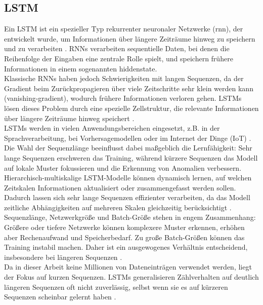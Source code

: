 \documentclass[a4paper,12pt]{article}
\begin{document}
	\subsection{LSTM}
	Ein LSTM ist ein spezieller Typ rekurrenter neuronaler Netzwerke (\gls{rnn}), der entwickelt wurde, um Informationen über längere Zeiträume hinweg zu speichern und zu verarbeiten \cite{hochreiter1997long}. RNNs verarbeiten sequentielle Daten, bei denen die Reihenfolge der Eingaben eine zentrale Rolle spielt, und speichern frühere Informationen in einem sogenannten \gls{hiddenstate}.  
	\\[0.5em]
	Klassische RNNs haben jedoch Schwierigkeiten mit langen Sequenzen, da der Gradient beim Zurückpropagieren über viele Zeitschritte sehr klein werden kann (\gls{vanishing-gradient}), wodurch frühere Informationen verloren gehen. LSTMs lösen dieses Problem durch eine spezielle Zellstruktur, die relevante Informationen über längere Zeiträume hinweg speichert \cite[S.19]{staudemeyer2019understanding}.  
	\\[0.5em]
	LSTMs werden in vielen Anwendungsbereichen eingesetzt, z.B. in der Sprachverarbeitung, bei Vorhersagemodellen oder im Internet der Dinge (IoT) \cite{wei2022lstm}. Die Wahl der Sequenzlänge beeinflusst dabei maßgeblich die Lernfähigkeit: Sehr lange Sequenzen erschweren das Training, während kürzere Sequenzen das Modell auf lokale Muster fokussieren und die Erkennung von Anomalien verbessern.  
	\\[0.5em]
	Hierarchisch-multiskalige LSTM-Modelle können dynamisch lernen, auf welchen Zeitskalen Informationen aktualisiert oder zusammengefasst werden sollen. Dadurch lassen sich sehr lange Sequenzen effizienter verarbeiten, da das Modell zeitliche Abhängigkeiten auf mehreren Skalen gleichzeitig berücksichtigt \cite{chung2017hierarchical}.  
	\\[0.5em]
	Sequenzlänge, Netzwerkgröße und Batch-Größe stehen in engem Zusammenhang: Größere oder tiefere Netzwerke können komplexere Muster erkennen, erhöhen aber Rechenaufwand und Speicherbedarf. Zu große Batch-Größen können das Training instabil machen. Daher ist ein ausgewogenes Verhältnis entscheidend, insbesondere bei längeren Sequenzen \cite{bengio1994learning}.  
	\\[0.5em]
	Da in dieser Arbeit keine Millionen von Dateneinträgen verwendet werden, liegt der Fokus auf kurzen Sequenzen. LSTMs generalisieren Zählverhalten auf deutlich längeren Sequenzen oft nicht zuverlässig, selbst wenn sie es auf kürzeren Sequenzen scheinbar gelernt haben \cite{elnaggar2022counting}.
		
\end{document}
